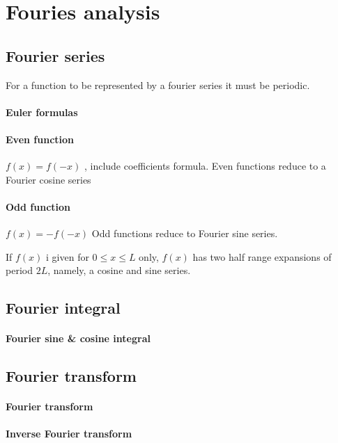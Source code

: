 \section{Fouries analysis}

\subsection{Fourier series}
For a function to be represented by a fourier series it must be
periodic.

\paragraph{Euler formulas}
\paragraph{Even function} $f(x) = f(-x)$ , include coefficients
formula. Even functions reduce to a Fourier cosine series
\paragraph{Odd function}  $f(x) = - f(-x)$ Odd functions reduce to
Fourier sine series.

If $f(x)$ i given for $0 \leq x \leq L$ only, $f(x)$ has two half
range expansions of period $2L$, namely, a cosine and sine series.

\subsection{Fourier integral}
\paragraph{Fourier sine \& cosine integral}

\subsection{Fourier transform}

\paragraph{Fourier transform}
\paragraph{Inverse Fourier transform}
